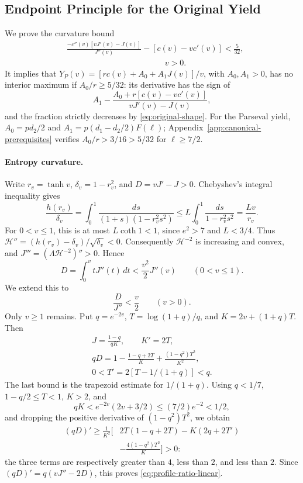 \subsection{Endpoint Principle for the Original Yield}
\label{app:original-yield}

We prove the curvature bound
\begin{equation}
 \begin{split}
 &\frac{-c''(v)[vJ'(v)-J(v)]}{J''(v)}-[c(v)-vc'(v)]<\frac5{32},\\
 &\hspace{12em}v>0.
 \end{split}
 \label{eq:original-shape}
\end{equation}
It implies that \(Y_P(v)=[r c(v)+A_0+A_1J(v)]/v\), with
\(A_0,A_1>0\), has no interior maximum if \(A_0/r\ge5/32\):
its derivative has the sign of
\[
 A_1-\frac{A_0+r[c(v)-vc'(v)]}{vJ'(v)-J(v)},
\]
and the fraction strictly decreases by \eqref{eq:original-shape}.
For the Parseval yield, \(A_0=pd_2/2\) and
\(A_1=p(d_1-d_2/2)F(\ell)\); Appendix~\ref{app:canonical-prerequisites}
verifies \(A_0/r>3/16>5/32\) for \(\ell\ge7/2\).

\paragraph{Entropy curvature.}
Write \(r_v=\tanh v\), \(\delta_v=1-r_v^2\), and
\(D=vJ'-J>0\). Chebyshev's integral inequality gives
\[
 \frac{h(r_v)}{\delta_v}
 =\int_0^1\frac{ds}{(1+s)(1-r_v^2s^2)}
 \le L\int_0^1\frac{ds}{1-r_v^2s^2}=\frac{Lv}{r_v}.
\]
For \(0<v\le1\), this is at most \(L\coth1<1\), since
\(e^2>7\) and \(L<3/4\). Thus
\({\mathcal H}''=(h(r_v)-\delta_v)/\sqrt{\delta_v}<0\).
Consequently \({\mathcal H}^{-2}\) is increasing and convex, and
\(J'''=(\Lambda{\mathcal H}^{-2})''>0\). Hence
\begin{equation}
 D=\int_0^v tJ''(t)\,dt<\frac{v^2}{2}J''(v)
 \qquad(0<v\le1).
 \label{eq:original-profile-curvature}
\end{equation}
We extend this to
\begin{equation}
 \frac{D}{J''}<\frac v2\qquad(v>0).
 \label{eq:profile-ratio-linear}
\end{equation}
Only \(v\ge1\) remains. Put
\(q=e^{-2v}\), \(T=\log(1+q)/q\), and \(K=2v+(1+q)T\).
Then
\begin{gather*}
 J=\frac{1-q}{qK},\qquad K'=2T,\\
 qD=1-\frac{1-q+2T}{K}+\frac{(1-q^2)T^2}{K^2},\\
 0<T'=2[T-1/(1+q)]<q.
\end{gather*}
The last bound is the trapezoid estimate for \(1/(1+q)\).
Using \(q<1/7\), \(1-q/2\le T<1\), \(K>2\), and
\[
 qK<e^{-2v}(2v+3/2)\le(7/2)e^{-2}<1/2,
\]
and dropping the positive derivative of \((1-q^2)T^2\), we obtain
\begin{align*}
 (qD)'\ge\frac1{K^2}\biggl[&2T(1-q+2T)-K(2q+2T')\\
 &-\frac{4(1-q^2)T^3}{K}\biggr]>0:
\end{align*}
the three terms are respectively greater than \(4\), less than
\(2\), and less than \(2\).
Since \((qD)'=q(vJ''-2D)\), this proves
\eqref{eq:profile-ratio-linear}.

